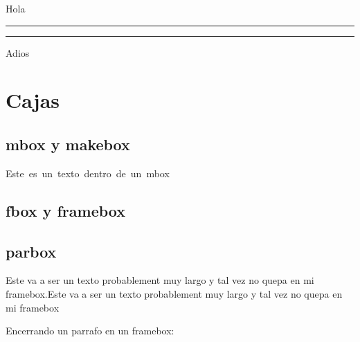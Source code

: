 \documentclass[12pt]{article}
\begin{document}
\begin{minipage}[t]{0.1\textwidth}

  Hola\\

  \hspace{3mm}\rule{2pt}{0.8\textheight} \rule{2pt}{0.8\textheight}

  Adios
\end{minipage}
\hspace{2cm}
\begin{minipage}[t]{0.6\textwidth}
  \tableofcontents
\end{minipage}

\newpage

  \section {Cajas}
		\subsection{mbox y makebox}
		
		\mbox{Este es un texto dentro de un mbox} 
		
		
		\subsection{fbox y framebox}
		
		
		
		
		\subsection{parbox}
		
    \parbox{0.5\textwidth}{Este va a ser un texto probablement muy largo y tal
    vez no quepa en mi framebox.Este va a ser un texto probablement muy largo y
    tal vez no quepa en mi framebox}
		
		Encerrando un parrafo en un framebox:
		
\end{document}
